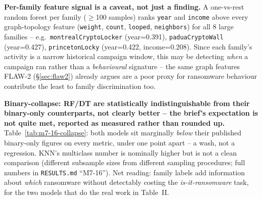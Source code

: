 \documentclass[conference]{IEEEtran}
\begin{document}
\textbf{Per-family feature signal is a caveat, not just a finding.} A one-vs-rest random forest per
family ($\geq$100 samples) ranks \texttt{year} and \texttt{income} above every graph-topology
feature (\texttt{weight}, \texttt{count}, \texttt{looped}, \texttt{neighbors}) for all 8 large
families -- e.g.\ \texttt{montrealCryptoLocker} (year=0.391), \texttt{paduaCryptoWall}
(year=0.427), \texttt{princetonLocky} (year=0.422, income=0.208). Since each family's activity is a
narrow historical campaign window, this may be detecting \emph{when} a campaign ran rather than a
\emph{behavioural} signature -- the same graph features FLAW-2 (\S\ref{sec:flaw2}) already argues
are a poor proxy for ransomware behaviour contribute the least to family discrimination too.

\begin{table}[t]
\centering
\caption{Binary-collapse comparison: multi-class predictions collapsed to ransomware-vs-benign and
scored identically to the binary detector, against the published full-scale \texttt{honest\_mode}
figures (\S\ref{sec:5b}).}
\label{tab:m7-16-collapse}
\footnotesize
{}
\end{table}

\textbf{Binary-collapse: RF/DT are statistically indistinguishable from their binary-only
counterparts, not clearly better -- the brief's expectation is not quite met, reported as
measured rather than rounded up.} Table~\ref{tab:m7-16-collapse}: both models sit marginally
\emph{below} their published binary-only figures on every metric, under one point apart -- a wash,
not a regression. KNN's multiclass number is nominally higher but is not a clean comparison
(different subsample sizes from different sampling procedures; full numbers in \texttt{RESULTS.md}
``M7-16''). Net reading: family labels add information about \emph{which} ransomware without
detectably costing the \emph{is-it-ransomware} task, for the two models that do the real work in
Table~II.
\end{document}
